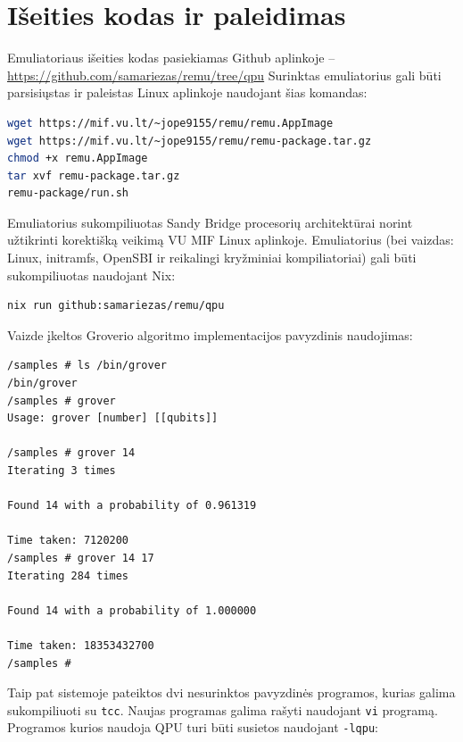 

\section{Išeities kodas ir paleidimas}
\label{chap:priedas-paleidimas}

Emuliatoriaus išeities kodas pasiekiamas Github aplinkoje -- \href{https://github.com/samariezas/remu/tree/qpu}{https://github.com/samariezas/remu/tree/qpu}
Surinktas emuliatorius gali būti parsisiųstas ir paleistas Linux aplinkoje naudojant šias komandas:

\begin{lstlisting}[language=Bash]
wget https://mif.vu.lt/~jope9155/remu/remu.AppImage
wget https://mif.vu.lt/~jope9155/remu/remu-package.tar.gz
chmod +x remu.AppImage
tar xvf remu-package.tar.gz
remu-package/run.sh
\end{lstlisting}

Emuliatorius sukompiliuotas Sandy Bridge procesorių architektūrai norint užtikrinti korektišką veikimą VU MIF Linux aplinkoje. Emuliatorius (bei vaizdas: Linux, initramfs, OpenSBI ir reikalingi kryžminiai kompiliatoriai) gali būti sukompiliuotas naudojant Nix:

\begin{lstlisting}
nix run github:samariezas/remu/qpu
\end{lstlisting}

Vaizde įkeltos Groverio algoritmo implementacijos pavyzdinis naudojimas:
\begin{lstlisting}
/samples # ls /bin/grover
/bin/grover
/samples # grover
Usage: grover [number] [[qubits]]

/samples # grover 14
Iterating 3 times

Found 14 with a probability of 0.961319

Time taken: 7120200
/samples # grover 14 17
Iterating 284 times

Found 14 with a probability of 1.000000

Time taken: 18353432700
/samples #
\end{lstlisting}

Taip pat sistemoje pateiktos dvi nesurinktos pavyzdinės programos, kurias galima sukompiliuoti su \texttt{tcc}. Naujas programas galima rašyti naudojant \texttt{vi} programą. Programos kurios naudoja QPU turi būti susietos naudojant \texttt{-lqpu}:

